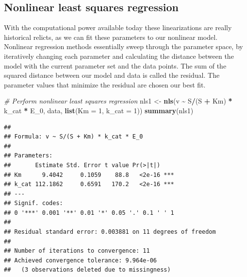 \documentclass[
]{article}
\newenvironment{Shaded}{\begin{snugshade}}{\end{snugshade}}
\newcommand{\AttributeTok}[1]{\textcolor[rgb]{0.13,0.29,0.53}{#1}}
\newcommand{\CommentTok}[1]{\textcolor[rgb]{0.56,0.35,0.01}{\textit{#1}}}
\newcommand{\DecValTok}[1]{\textcolor[rgb]{0.00,0.00,0.81}{#1}}
\newcommand{\FunctionTok}[1]{\textcolor[rgb]{0.13,0.29,0.53}{\textbf{#1}}}
\newcommand{\NormalTok}[1]{#1}
\newcommand{\OtherTok}[1]{\textcolor[rgb]{0.56,0.35,0.01}{#1}}
\newcommand{\SpecialCharTok}[1]{\textcolor[rgb]{0.81,0.36,0.00}{\textbf{#1}}}
\begin{document}
\hypertarget{nonlinear-least-squares-regression}{%
\subsection{Nonlinear least squares regression}\label{nonlinear-least-squares-regression}}

With the computational power available today these linearizations are really historical relicts, as we can fit these parameters to our nonlinear model. Nonlinear regression methods essentially sweep through the parameter space, by iteratively changing each parameter and calculating the distance between the model with the current parameter set and the data points. The sum of the squared distance between our model and data is called the residual. The parameter values that minimize the residual are chosen our best fit.

\begin{Shaded}
\begin{Highlighting}[]
\CommentTok{\# Perform nonlinear least squares regression}
\NormalTok{nls1 }\OtherTok{\textless{}{-}} \FunctionTok{nls}\NormalTok{(v }\SpecialCharTok{\textasciitilde{}}\NormalTok{ S}\SpecialCharTok{/}\NormalTok{(S }\SpecialCharTok{+}\NormalTok{ Km) }\SpecialCharTok{*}\NormalTok{ k\_cat }\SpecialCharTok{*}\NormalTok{ E\_0, data, }\FunctionTok{list}\NormalTok{(}\AttributeTok{Km =} \DecValTok{1}\NormalTok{,}
    \AttributeTok{k\_cat =} \DecValTok{1}\NormalTok{))}
\FunctionTok{summary}\NormalTok{(nls1)}
\end{Highlighting}
\end{Shaded}

\begin{verbatim}
## 
## Formula: v ~ S/(S + Km) * k_cat * E_0
## 
## Parameters:
##       Estimate Std. Error t value Pr(>|t|)    
## Km      9.4042     0.1059    88.8   <2e-16 ***
## k_cat 112.1862     0.6591   170.2   <2e-16 ***
## ---
## Signif. codes:  
## 0 '***' 0.001 '**' 0.01 '*' 0.05 '.' 0.1 ' ' 1
## 
## Residual standard error: 0.003881 on 11 degrees of freedom
## 
## Number of iterations to convergence: 11 
## Achieved convergence tolerance: 9.964e-06
##   (3 observations deleted due to missingness)
\end{verbatim}
\end{document}
